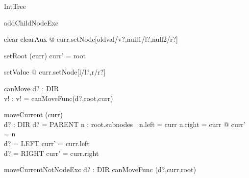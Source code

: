 \documentclass{article}
\begin{document}
\begin{class}{IntTree}
\begin{op}{addChildNodeExc}
\end{op}\classbreak
{}\classbreak
{}\classbreak
clear \sdef clearAux @ curr.setNode[oldval/v?,null1/l?,null2/r?] \\
\begin{op}{setRoot}
        \Delta (curr)
\where
	curr' = root
\end{op}\classbreak
setValue \sdef [ v? : \num ; l, r : Node | l = curr.left \land r = curr.right ] @ curr.setNode[l/l?,r/r?] \classbreak
{}\classbreak
\begin{op}{canMove}
	d? : DIR \\
        v! : \bool
\where
	v! = canMoveFunc(d?,root,curr)
\end{op}\classbreak
\begin{op}{moveCurrent}
        \Delta (curr) \\
        d? : DIR
\where
	d? = PARENT \implies
		\exists n : root.subnodes | n.left = curr \lor n.right = curr
			@ curr' = n \\
	d? = LEFT \implies curr' = curr.left \\
	d? = RIGHT \implies curr' = curr.right
\end{op}\classbreak
\begin{op}{moveCurrentNotNodeExc}
        d? : DIR
\where
	\lnot canMoveFunc (d?,curr,root)
\end{op}
\end{class}
\end{document}
